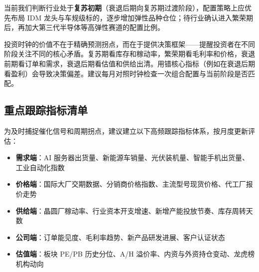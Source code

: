 \begin{exhibitbox}[图 10-2：功率半导体投资时钟]
\end{exhibitbox}

当前我们判断行业处于\textbf{复苏初期}（衰退后期向复苏期过渡阶段），配置策略上应优先布局 IDM 龙头与车规级标的，逐步增加弹性品种仓位；待行业确认进入繁荣期后，再加大第三代半导体等高弹性赛道的配置比例。

\begin{keyinsight}[投资时钟的实操要点]
投资时钟的价值不在于精确预测拐点，而在于提供决策框架——提醒投资者在不同阶段关注不同的核心矛盾。复苏期看库存和稼动率，繁荣期看毛利率和价格，衰退前期看订单和需求，衰退后期看估值和供给出清。用错核心指标（例如在衰退后期看盈利）会导致决策偏差。建议每月对照时钟检查一次组合配置与当前阶段是否匹配。
\end{keyinsight}

\subsection{重点跟踪指标清单}

为及时捕捉催化信号和周期拐点，建议建立以下高频跟踪指标体系，按月度更新评估：

\vspace{0.2em}
\begin{itemize}[leftmargin=2em]
\item \textbf{需求端}：AI 服务器出货量、新能源车销量、光伏装机量、智能手机出货量、工业自动化指数
\item \textbf{价格端}：国际大厂交期数据、分销商价格指数、主流型号现货价格、代工厂报价走势
\item \textbf{供给端}：晶圆厂稼动率、行业资本开支增速、新增产能投放节奏、库存周转天数
\item \textbf{公司端}：订单能见度、毛利率趋势、新产品研发进展、客户认证状态
\item \textbf{估值端}：板块 PE/PB 历史分位、A/H 溢价率、内资与外资持仓变动、龙虎榜机构动向
\end{itemize}
